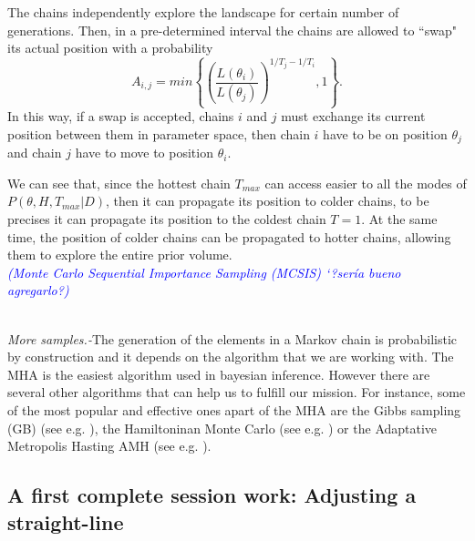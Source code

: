 \documentclass[onecolumn,           %
               showpacs,            %
               preprintnumbers,     %
               aps,                 %
               prl,          	    %
               letterpaper,             %
               superscriptaddress,      %
               nofootinbib,         %
               tightenlines,        %
               floats,floatfix      %
               ,usenatbib,
               ]{revtex4-1}
\begin{document}
The chains independently explore the landscape for certain number of generations. Then, in a pre-determined interval the chains are allowed to ``swap" its actual position with a probability
\begin{equation}
A_{i,j}=min\left\lbrace\left(\frac{L(\theta_i)}{L(\theta_j)}\right)^{1/T_j-1/T_i},1\right\rbrace .
\end{equation}
In this way, if a swap is accepted, chains $i$ and $j$ must exchange its current position between them in parameter space, then chain $i$ have to be on position $\theta_j$ and chain $j$ have to move to position $\theta_i$. 

We can see that, since the hottest chain $T_{max}$ can access easier to all the modes of $P(\theta,H,T_{max}|D)$, then it can propagate its position to colder chains, to be precises it can propagate its position to the coldest chain $T=1$. At the same time, the position of colder chains can be propagated to hotter chains, allowing them to explore the entire prior volume.   
\\

\textit{\textcolor{blue}{(Monte Carlo Sequential Importance Sampling (MCSIS) `?ser\'ia bueno agregarlo?)}}
\\ $ $

\textit{More samples.-}The generation of the elements in a Markov chain is probabilistic by construction and it depends on the algorithm that we are working with. The MHA is the easiest algorithm used in bayesian inference. However there are several other algorithms that can help us to fulfill our mission. For instance, some of the most popular and effective ones apart of the MHA are the Gibbs sampling (GB) (see e.g. \cite{gibbs1,gibbs2}), the Hamiltoninan Monte Carlo (see e.g. \cite{hamiltonian1,Hamiltonian2}) or the Adaptative Metropolis Hasting AMH (see e.g. \cite{importance}).\\
 
 \subsection{A first complete session work: Adjusting a straight-line}
\end{document}
